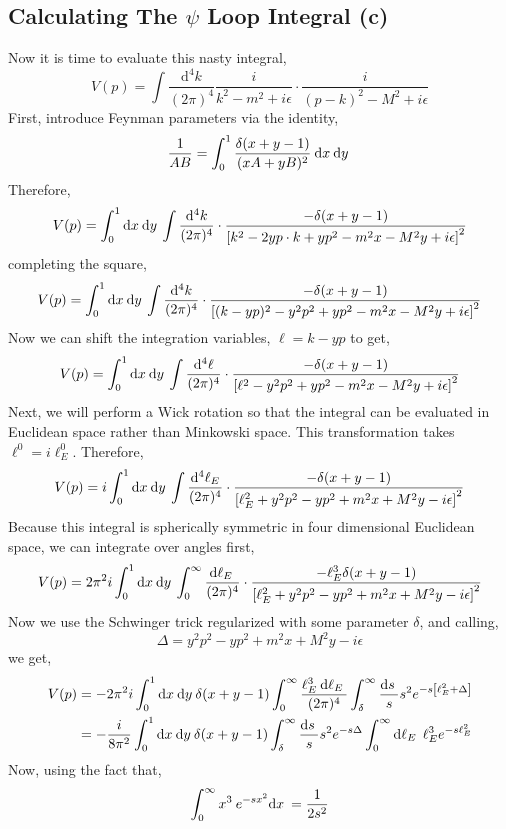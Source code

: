 \documentclass{article}
\begin{document}
\subsection{Calculating The $\psi$ Loop Integral (c)}
Now it is time to evaluate this nasty integral,
\[ V(p) = \int \frac{\mathrm{d}^4 k}{(2 \pi)^4} \frac{i}{k^2 - m^2 + i \epsilon} \cdot \frac{i}{(p - k)^2 - M^2 + i \epsilon} \]
First, introduce Feynman parameters via the identity,
\[ \frac{1}{AB} = \int_0^1 \frac{\delta(x+y-1)}{(xA + y B)^2} \: \mathrm{d}x \:\mathrm{d}y \: \] 
Therefore,
\[ V(p) = \int_{0}^{1} \mathrm{d}x \: \mathrm{d}y \: \int \frac{\mathrm{d}^4 k}{(2\pi)^4} \cdot \frac{-\delta(x + y - 1)}{\left[k^2 - 2 y p \cdot k + y p^2 - m^2 x - M^2 y + i \epsilon \right]^2}\]
completing the square,
\[ V(p) = \int_{0}^{1} \mathrm{d}x \: \mathrm{d}y \: \int \frac{\mathrm{d}^4 k}{(2\pi)^4} \cdot \frac{-\delta(x + y - 1)}{\left[(k - y p)^2 - y^2 p^2 + y p^2 - m^2 x - M^2 y + i \epsilon \right]^2}\]
Now we can shift the integration variables, $\ell = k - y p$ to get,
\[ V(p) = \int_{0}^{1} \mathrm{d}x \: \mathrm{d}y \: \int \frac{\mathrm{d}^4 \ell}{(2\pi)^4} \cdot \frac{-\delta(x + y - 1)}{\left[\ell^2 - y^2 p^2 + y p^2 - m^2 x - M^2 y + i \epsilon \right]^2}\]
Next, we will perform a Wick rotation so that the integral can be evaluated in Euclidean space rather than Minkowski space. This transformation takes $\ell^0 = i \ell^0_E$. Therefore, 
\[ V(p) = i \int_{0}^{1} \mathrm{d}x \: \mathrm{d}y \: \int \frac{\mathrm{d}^4 \ell_E}{(2\pi)^4} \cdot \frac{-\delta(x + y - 1)}{\left[\ell_E^2 + y^2 p^2 - y p^2 + m^2 x + M^2 y - i \epsilon \right]^2}\]
Because this integral is spherically symmetric in four dimensional Euclidean space, we can integrate over angles first, 
\[ V(p) = 2 \pi^2 i \int_{0}^{1} \mathrm{d}x \: \mathrm{d}y \: \int_{0}^\infty \frac{\mathrm{d}\ell_E \:}{(2\pi)^4} \cdot \frac{ -\ell_E^3 \delta(x + y - 1)}{\left[\ell_E^2 + y^2 p^2 - y p^2 + m^2 x + M^2 y - i \epsilon \right]^2}\]
Now we use the Schwinger trick regularized with some parameter $\delta$, and calling,
\[\Delta = y^2 p^2 - y p^2 + m^2 x + M^2 y - i \epsilon\]
we get,
\begin{align*}
V(p) & = -2 \pi^2 i \int_{0}^{1} \mathrm{d}x \: \mathrm{d}y \: \delta(x + y - 1) \int_{0}^\infty \frac{\ell_E^3 \: \mathrm{d}\ell_E \: }{(2\pi)^4} \int_{\delta}^\infty \frac{\mathrm{d}s \:}{s} s^2 e^{ - s \left[  \ell_E^2 + \Delta \right] } 
\\
& = -\frac{i}{8 \pi^2} \int_{0}^{1} \mathrm{d}x \: \mathrm{d}y \: \delta(x + y - 1) \int_{\delta}^\infty \frac{\mathrm{d}s \:}{s} s^2 e^{ - s \Delta } \int_{0}^\infty \mathrm{d}\ell_E \: \: \ell_E^3 e^{-s \ell_E^2} 
\end{align*} 
Now, using the fact that,
\[ \int_0^\infty x^3 \: e^{-s x^2} \mathrm{d}x \: = \frac{1}{2 s^2} \]
\end{document}
